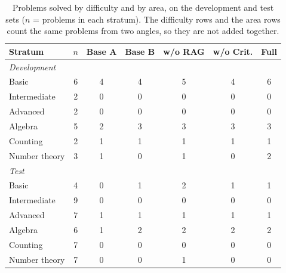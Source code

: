 \begin{table}[t]
\centering
\caption{Problems solved by difficulty and by area, on the development and test sets ($n$ = problems in each stratum). The difficulty rows and the area rows count the same problems from two angles, so they are not added together.}
\label{tab:strata}
\footnotesize
\setlength{\tabcolsep}{3pt}
\begin{tabular}{lcccccc}
\hline
Stratum & $n$ & Base A & Base B & w/o RAG & w/o Crit. & Full \\
\hline
\multicolumn{7}{l}{\textit{Development}} \\
Basic & 6 & 4 & 4 & 5 & 4 & 6 \\
Intermediate & 2 & 0 & 0 & 0 & 0 & 0 \\
Advanced & 2 & 0 & 0 & 0 & 0 & 0 \\
Algebra & 5 & 2 & 3 & 3 & 3 & 3 \\
Counting & 2 & 1 & 1 & 1 & 1 & 1 \\
Number theory & 3 & 1 & 0 & 1 & 0 & 2 \\
\hline
\multicolumn{7}{l}{\textit{Test}} \\
Basic & 4 & 0 & 1 & 2 & 1 & 1 \\
Intermediate & 9 & 0 & 0 & 0 & 0 & 0 \\
Advanced & 7 & 1 & 1 & 1 & 1 & 1 \\
Algebra & 6 & 1 & 2 & 2 & 2 & 2 \\
Counting & 7 & 0 & 0 & 0 & 0 & 0 \\
Number theory & 7 & 0 & 0 & 1 & 0 & 0 \\
\hline
\end{tabular}
\end{table}
